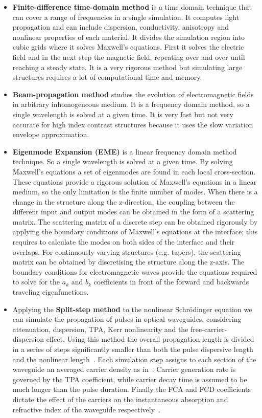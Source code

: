 \begin{itemize}
\item \textbf{Finite-difference time-domain method} is a time domain technique that can cover a range of frequencies in a single simulation. It computes light propagation and can include dispersion, conductivity, anisotropy and nonlinear properties of each material. It divides the simulation region into cubic grids where it solves Maxwell's equations. First it solves the electric field and in the next step the magnetic field, repeating over and over until reaching a steady state. It is a very rigorous method but simulating large structures requires a lot of computational time and memory.

\item \textbf{Beam-propagation method} studies the evolution of electromagnetic fields in arbitrary inhomogeneous medium. It is a frequency domain method, so a single wavelength is solved at a given time.
It is very fast but not very accurate for high index contrast structures because it uses the slow variation envelope approximation.

\item \textbf{Eigenmode Expansion (EME)} is a linear frequency domain method technique. So a single wavelength is solved at a given time. By solving Maxwell's equations a set of eigenmodes are found in each local cross-section. 
These equations provide a rigorous solution of Maxwell's equations in a linear medium, so the only limitation is the finite number of modes.
When there is a change in the structure along the z-direction, the coupling between the different input and output modes can be obtained in the form of a scattering matrix. The scattering matrix of a discrete step can be obtained rigorously by applying the boundary conditions of Maxwell's equations at the interface; this requires to calculate the modes on both sides of the interface and their overlaps. For continuously varying structures (e.g. tapers), the scattering matrix can be obtained by discretising the structure along the z-axis.
The boundary conditions for electromagnetic waves provide the equations required to solve for the $a_k$ and $b_k$ coefficients in front of the forward and backwards traveling eigenfunctions.

\item Applying the \textbf{Split-step method} to the nonlinear Schr\"{o}dinger equation we can simulate the propagation of pulses in optical waveguides, considering  attenuation, dispersion, TPA, Kerr nonlinearity and the free-carrier-dispersion effect. 
Using this method the overall propagation-length is divided in a series of steps significantly smaller than both the pulse dispersive length and the nonlinear length~\cite{Agrawal2001a,Lin2007}.
Each simulation step assigns to each section of the waveguide an averaged carrier density as in~\cite{Lin2007}.
Carrier generation rate is governed by the TPA coefficient, while carrier decay time is assumed to be much longer than the pulse duration.
Finally the FCA and FCD coefficients dictate the effect of the carriers on the instantaneous absorption and refractive index of the waveguide respectively~\cite{Lin2007}.

\end{itemize}

